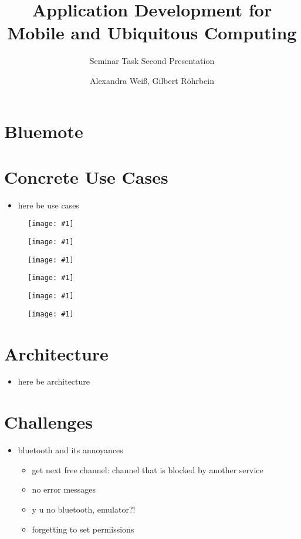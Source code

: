 \documentclass[ddc nogerman]{tudbeamer}
\newcommand{\imageframe}[1]{
    \begin{frame}
        \begin{figure}
            \centering
            \texttt{[image: \#1]}
        \end{figure}
    \end{frame}
}
\begin{document}

\title{Application Development for Mobile and Ubiquitous Computing}
\subtitle{Seminar Task Second Presentation}
\author{Alexandra Weiß, Gilbert Röhrbein}

\maketitle

\section{Bluemote}
\begin{frame}
\end{frame}

\section{Concrete Use Cases}
\begin{frame}
    \begin{itemize}
        \item here be use cases

    \end{itemize}
\end{frame}

\imageframe{img/btactivate.png}
\imageframe{img/btauth.png}
\imageframe{img/choosedevice.png}
\imageframe{img/choosefunction.png}
\imageframe{img/presentation.png}
\imageframe{img/vlc.png}

\section{Architecture}
\begin{frame}
    \begin{itemize}
        \item here be architecture
    \end{itemize}
\end{frame}

\section{Challenges}
\begin{frame}
    \begin{itemize}
        \item bluetooth and its annoyances
        \begin{itemize}
        	\item get next free channel: channel that is blocked by another service
        	\item no error messages
            \item y u no bluetooth, emulator?!
            \item forgetting to set permissions
        \end{itemize}
    \end{itemize}
\end{frame}
\end{document}
